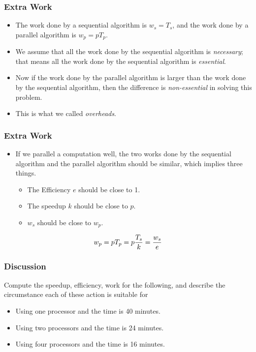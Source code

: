 \documentclass{beamer}
\begin{document}
\begin{CJK}{UTF8}{bsmi}
\begin{frame}
\frametitle{Extra Work}
\begin{itemize}
\item The work done by a sequential algorithm is $w_s = T_s$, and the
  work done by a parallel algorithm is $w_p = p T_p$.
\item We assume that all the work done by the sequential algorithm is
  {\em necessary}; that means all the work done by the sequential
  algorithm is {\em essential}.
\item Now if the work done by the parallel algorithm is larger than
  the work done by the sequential algorithm, then the difference is {\em
    non-essential} in solving this problem.
\item This is what we called {\em overheads}.
\end{itemize}
\end{frame}


\begin{frame}
\frametitle{Extra Work}
\begin{itemize}
\item If we parallel a computation well, the two works done by the
  sequential algorithm and the parallel algorithm should be similar,
  which implies three things.
\begin{itemize}
\item The Efficiency $e$ should be close to 1.
\item The speedup $k$ should be close to $p$.
\item $w_s$ should be close to $w_p$.
\end{itemize}
\end{itemize}

\begin{equation}
w_p = p T_p = p {T_s \over k} = {w_s \over e}
\end{equation}
\end{frame}

\begin{frame}
\frametitle{Discussion} Compute the speedup, efficiency, work for the
following, and describe the circumstance each of these action is
suitable for
\begin{itemize}
\item Using one processor and the time is 40 minutes.
\item Using two processors and the time is 24 minutes.
\item Using four processors and the time is 16 minutes.
\end{itemize}
\end{frame}


\end{CJK}
\end{document}
